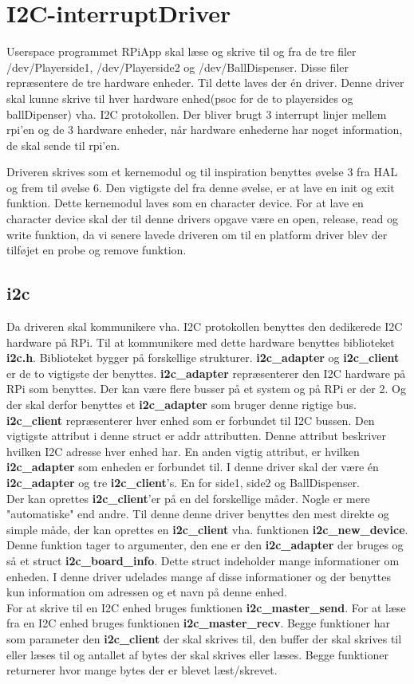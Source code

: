 \documentclass[Softwaredesign/Softwaredesign_main.tex]{subfiles}
\begin{document}
\section{I2C-interruptDriver}
Userspace programmet RPiApp skal læse og skrive til og fra de tre filer /dev/Playerside1, /dev/Playerside2 og /dev/BallDispenser. Disse filer repræsentere de tre hardware enheder. Til dette laves der én driver. Denne driver skal kunne skrive til hver hardware enhed(psoc for de to playersides og ballDipenser) vha. I2C protokollen. Der bliver brugt 3 interrupt linjer mellem rpi'en og de 3 hardware enheder, når hardware enhederne har noget information, de skal sende til rpi'en. 

Driveren skrives som et kernemodul og til inspiration benyttes øvelse 3 fra HAL og frem til øvelse 6. Den vigtigste del fra denne øvelse, er at lave en init og exit funktion. Dette kernemodul laves som en character device. For at lave en character device skal der til denne drivers opgave være en open, release, read og write funktion, da vi senere lavede driveren om til en platform driver blev der tilføjet en probe og remove funktion.

\subsection{i2c}
Da driveren skal kommunikere vha. I2C protokollen benyttes den dedikerede I2C hardware på RPi. Til at kommunikere med dette hardware benyttes biblioteket \textbf{i2c.h}. Biblioteket bygger på forskellige strukturer. \textbf{i2c\_adapter} og\textbf{ i2c\_client} er de to vigtigste der benyttes. 
\textbf{i2c\_adapter} repræsenterer den I2C hardware på RPi som benyttes. Der kan være flere busser på et system og på RPi er der 2. Og der skal derfor benyttes et \textbf{i2c\_adapter} som bruger denne rigtige bus. 
\textbf{i2c\_client} repræsenterer hver enhed som er forbundet til I2C bussen. Den vigtigste attribut i denne struct er addr attributten. Denne attribut beskriver hvilken I2C adresse hver enhed har. En anden vigtig attribut, er hvilken \textbf{i2c\_adapter} som enheden er forbundet til.
I denne driver skal der være én \textbf{i2c\_adapter} og tre \textbf{i2c\_client}'s. En for side1, side2 og BallDispenser. \\
Der kan oprettes \textbf{i2c\_client}'er på en del forskellige måder. Nogle er mere "automatiske" end andre. Til denne denne driver benyttes den mest direkte og simple måde, der kan oprettes en \textbf{i2c\_client} vha. funktionen \textbf{i2c\_new\_device}. Denne funktion tager to argumenter, den ene er den \textbf{i2c\_adapter} der bruges og så et struct \textbf{i2c\_board\_info}. Dette struct indeholder mange informationer om enheden. I denne driver udelades mange af disse informationer og der benyttes kun information om adressen og et navn på denne enhed.\\
For at skrive til en I2C enhed bruges funktionen \textbf{i2c\_master\_send}. For at læse fra en I2C enhed bruges funktionen \textbf{i2c\_master\_recv}. Begge funktioner har som parameter den\textbf{ i2c\_client} der skal skrives til, den buffer der skal skrives til eller læses til og antallet af bytes der skal skrives eller læses. Begge funktioner returnerer hvor mange bytes der er blevet læst/skrevet.
\end{document}
